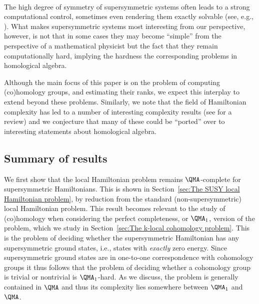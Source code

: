 \documentclass[11pt]{article}
\numberwithin{equation}{section}
\renewcommand\( {\left(}
\renewcommand\) {\right)}
\begin{document}
\ 

The high degree of symmetry of supersymmetric systems often leads to a strong computational control, sometimes even rendering them exactly solvable (see, e.g., \cite{Fendley_2003,Hagendorf_2014}). What makes supersymmetric systems most interesting from our perspective, however, is not that in some cases they may become ``simple'' from the perspective of a  mathematical physicist  but the fact that they remain computationally hard, implying the hardness the corresponding problems in homological algebra.


Although the main focus of this paper is on the problem of computing (co)homology groups, and estimating their ranks, we expect this interplay to extend beyond these problems. Similarly, we note that the field of  Hamiltonian complexity has led  to a number of interesting complexity results (see \cite{2014arXiv1401.3916G} for a review) and we conjecture that many of these  could be ``ported'' over to interesting statements about homological algebra. 


\subsection{Summary of results}

We first show that the local Hamiltonian problem remains $\QMA$-complete for supersymmetric Hamiltonians. This is shown in Section~\ref{sec:The SUSY local Hamiltonian problem}, by reduction from the standard (non-supersymmetric) local Hamiltonian problem. 
This result becomes relevant to the study of (co)homology when considering the perfect completeness, or  $\QMA_1$, version of the problem, which we study in Section~\ref{sec:The k-local cohomology problem}. This is the problem of deciding whether the supersymmetric Hamiltonian has any supersymmetric ground states, i.e., states with {\it exactly} zero energy. Since supersymmetric ground states are in one-to-one correspondence with cohomology groups it thus follows that the problem of deciding whether a cohomology group is trivial or nontrivial is $\QMA_{1}$-hard. As we discuss, the problem is generally contained in $\QMA$ and thus its complexity lies somewhere between $\QMA_{1}$ and $\QMA$. 
\end{document}
